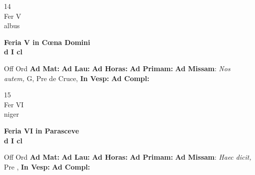 \documentclass[10pt, openany]{book}
\begin{document}
    \begin{center}
        \begin{minipage}{3.5in}
            \vspace{2em}
            \begin{minipage}{0.5in}
                {\Huge 14} \\
                {\normalsize Fer V} \\
                {\normalsize albus}
            \end{minipage}
            \begin{minipage}{3.0in}
                \textbf{ \large Feria V in Cœna Domini \\
                \textnormal{\normalsize d I cl}} \\ 
            \end{minipage}
            \begin{justify}Off Ord
                \textbf{Ad Mat: }
                \textbf{Ad Lau: }
                \textbf{Ad Horas: }
                \textbf{Ad Primam: }\textbf{Ad Missam}: \textit{Nos autem,} G, Pre de Cruce,  
                \textbf{In Vesp: }
                \textbf{Ad Compl: }
            \end{justify}
        \end{minipage}
    \end{center}

    \begin{center}
        \begin{minipage}{3.5in}
            \vspace{2em}
            \begin{minipage}{0.5in}
                {\Huge 15} \\
                {\normalsize Fer VI} \\
                {\normalsize niger}
            \end{minipage}
            \begin{minipage}{3.0in}
                \textbf{ \large Feria VI in Parasceve \\
                \textnormal{\normalsize d I cl}} \\ 
            \end{minipage}
            \begin{justify}Off Ord
                \textbf{Ad Mat: }
                \textbf{Ad Lau: }
                \textbf{Ad Horas: }
                \textbf{Ad Primam: }\textbf{Ad Missam}: \textit{Haec dicit,} Pre ,  
                \textbf{In Vesp: }
                \textbf{Ad Compl: }
            \end{justify}
        \end{minipage}
    \end{center}
\end{document}
